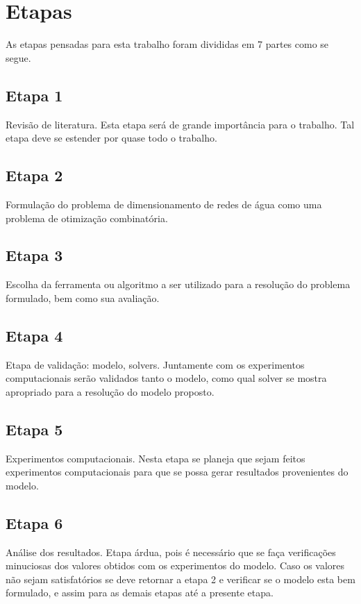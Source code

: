 \documentclass[
	12pt,				%
	openright,			%
	twoside,			%
	a4paper,			%
	english,			%
	french,				%
	spanish,			%
	brazil				%
	]{abntex2}
\begin{document}
\section{Etapas}
	 As etapas pensadas para esta trabalho foram divididas em 7 partes como se segue.
	 
\subsection{Etapa 1} 
	Revisão de literatura. Esta etapa será de grande importância para o trabalho. Tal etapa deve se estender por quase todo o trabalho.
 
\subsection{Etapa 2}	
	Formulação do problema de dimensionamento de redes de água como uma problema de otimização combinatória.
 
\subsection{Etapa 3}
	Escolha da ferramenta ou algoritmo a ser utilizado para a resolução do problema formulado, bem como sua avaliação.
 
\subsection{Etapa 4}
	Etapa de validação: modelo, solvers. Juntamente com os experimentos computacionais serão validados tanto o modelo, como qual solver se mostra apropriado para a resolução do modelo proposto.
 
\subsection{Etapa 5}
 	Experimentos computacionais. Nesta etapa se planeja que sejam feitos experimentos computacionais para que se possa gerar resultados provenientes do modelo.
 
\subsection{Etapa 6}
	Análise dos resultados. Etapa árdua, pois é necessário que se faça verificações minuciosas dos valores obtidos com os experimentos do modelo. Caso os valores não sejam satisfatórios se deve retornar a etapa 2 e verificar se o modelo esta bem formulado, e assim para as demais etapas até a presente etapa.
 
\end{document}
